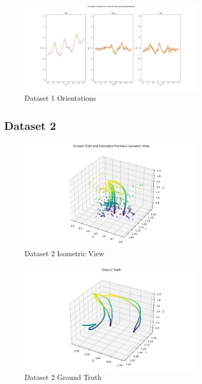 \documentclass{article}
\begin{document}
\begin{figure}[H]
    \centering
    \includegraphics[width=0.8\textwidth]{./imgs/task1_2/studentdata1_orientation_merged.png}
    \caption{Dataset 1 Orientations}
\end{figure}

\subsection*{Dataset 2}

\begin{figure}[H]
    \centering
    \includegraphics[width=0.8\textwidth]{./imgs/task1_2/studentdata2_isometric.png}
    \caption{Dataset 2 Isometric View}
\end{figure}

\begin{figure}[H]
    \centering
    \includegraphics[width=0.8\textwidth]{./imgs/task1_2/studentdata2_ground_truth.png}
    \caption{Dataset 2 Ground Truth}
\end{figure}
\end{document}
